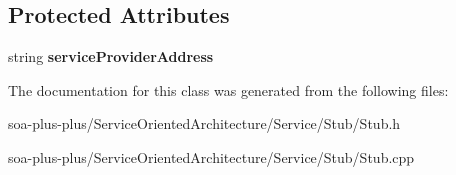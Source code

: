 \subsection*{Protected Attributes}
\begin{DoxyCompactItemize}
\item 
\hypertarget{class_stub_adaf5bf73809522ac8f1baf82c0337048}{
string {\bfseries serviceProviderAddress}}
\label{class_stub_adaf5bf73809522ac8f1baf82c0337048}

\end{DoxyCompactItemize}


The documentation for this class was generated from the following files:\begin{DoxyCompactItemize}
\item 
soa-\/plus-\/plus/ServiceOrientedArchitecture/Service/Stub/Stub.h\item 
soa-\/plus-\/plus/ServiceOrientedArchitecture/Service/Stub/Stub.cpp\end{DoxyCompactItemize}
